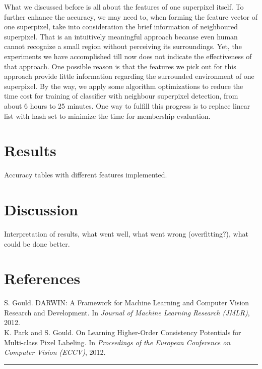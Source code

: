 \documentclass[12pt,a4paper]{article}
\newcommand{\Hrule}{\textcolor{blue}{\rule{\linewidth}{0.5mm}}}
\begin{document}
\begin{multicols}{2}
What we discussed before is all about the features of one superpixel itself. To further enhance the accuracy, we may need to, when forming the feature vector of one superpixel, take into consideration the brief information of neighboured superpixel. That is an intuitively meaningful approach because even human cannot recognize a small region without perceiving its surroundings. Yet, the experiments we have accomplished till now does not indicate the effectiveness of that approach. One possible reason is that the features we pick out for this approach provide little information regarding the surrounded environment of one superpixel. By the way, we apply some algorithm optimizations to reduce the time cost for training of classifier with neighbour superpixel detection, from about 6 hours to 25 minutes. One way to fulfill this progress is to replace linear list with hash set to minimize the time for membership evaluation. 

\section{Results}
Accuracy tables with different features implemented.\\

\section{Discussion}
Interpretation of results, what went well, what went wrong (overfitting?), what could be done better. \\

\section{References}
S. Gould. DARWIN: A Framework for Machine Learning and Computer Vision Research and Development. In \textit{Journal of Machine Learning Research (JMLR)}, 2012.\\
K. Park and S. Gould. On Learning Higher-Order Consistency Potentials for Multi-class Pixel Labeling. In \textit{Proceedings of the European Conference on Computer Vision (ECCV)}, 2012.

\end{multicols}
\vfill\Hrule
\end{document}
